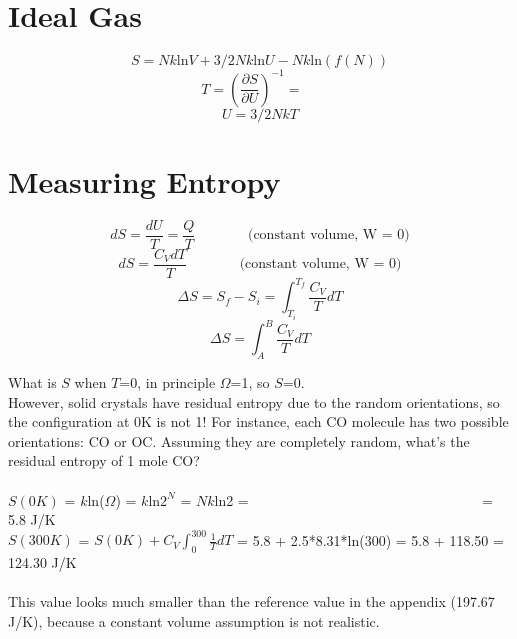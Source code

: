 \section{Ideal Gas}

\begin{equation} S = Nk\text{ln}V + 3/2Nk\text{ln}U - Nk\text{ln}(f(N)) \end{equation}
\begin{equation} T = (\frac {\partial{S}} {\partial{U}}) ^{-1} = ~~~~~\end{equation}
\begin{equation} U = 3/2NkT \end{equation}


\section{Measuring Entropy}
\begin{equation} dS = \frac{dU}{T} = \frac{Q}{T}   ~~~~~~~~~~~~~~~~~ \text{(constant volume, W = 0)}\end{equation}
\begin{equation} dS = \frac{C_VdT}{T}   ~~~~~~~~~~~~~~~~~ \text{(constant volume, W = 0)}\end{equation}
\begin{equation} \Delta{S} = S_f-S_i = \int^{T_f}_{T_i} \frac{C_V}{T} dT \end{equation}
\begin{equation} \Delta{S} = \int^B_A \frac{C_V}{T} dT \end{equation}

What is $S$ when $T$=0, in principle $\Omega$=1, so $S$=0.\\
However, solid crystals have residual entropy due to the random orientations, so the configuration at 0K is not 1!
For instance, each CO molecule has two possible orientations: CO or OC. Assuming they are completely random, what's the residual entropy of 1 mole CO?\\\\
$S(0K)$ = $k$ln($\Omega$) = $k$ln$2^N$ = $Nk$ln2 = ~~~~~~~~~~~~~~~~~~~~~~~~~~~~~~~~ = 5.8 J/K\\
$S(300K)$ = $S(0K) + C_V \int^{300}_{0} \frac{1}{T} dT$ = 5.8 + 2.5*8.31*ln(300) = 5.8 + 118.50 = 124.30 J/K\\\\
This value looks much smaller than the reference value in the appendix (197.67 J/K), because a constant volume assumption is not realistic.

